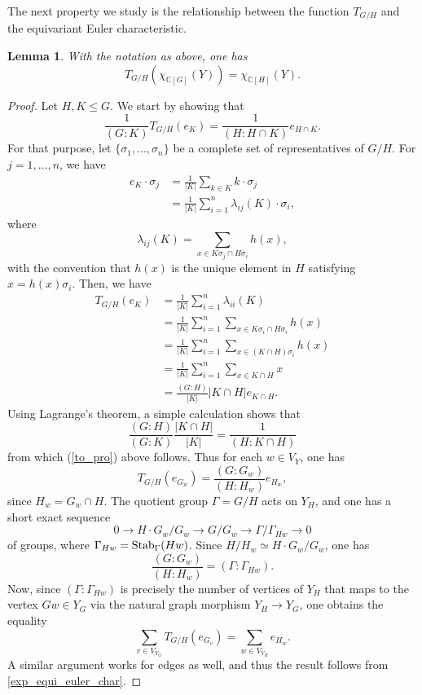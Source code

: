 \documentclass[11pt]{amsart}
\newtheorem{lemma}[theorem]{Lemma}
\numberwithin{equation}{section}
\theoremstyle{remark}
\theoremstyle{definition}
\begin{document}
The next property we study is the relationship between the function $T_{G/H}$ and the equivariant Euler characteristic.
\begin{lemma} \label{eul_and_T}
With the notation as above, one has
$$T_{G/H}(\chi_{\mathbb{C}[G]}(Y)) = \chi_{\mathbb{C}[H]}(Y). $$
\end{lemma}
\begin{proof}
Let $H,K \le G$.  We start by showing that
\begin{equation} \label{to_pro}
\frac{1}{(G:K)}T_{G/H}(e_{K}) = \frac{1}{(H:H \cap K)} e_{H \cap K}. 
\end{equation}
For that purpose, let $\{\sigma_{1},\ldots, \sigma_{n} \}$ be a complete set of representatives of $G/H$.  For $j=1,\ldots,n$, we have
\begin{equation*} 
\begin{aligned}
e_{K} \cdot \sigma_{j} &= \frac{1}{|K|} \sum_{k \in K} k \cdot \sigma_{j} \\
&= \frac{1}{|K|} \sum_{i=1}^{n} \lambda_{ij}(K) \cdot \sigma_{i},
\end{aligned}
\end{equation*}
where
$$\lambda_{ij}(K) = \sum_{x \in K\sigma_{j} \cap H \sigma_{i}} h(x), $$
with the convention that $h(x)$ is the unique element in $H$ satisfying $x = h(x)\sigma_{i}$.  Then, we have
\begin{equation*}
\begin{aligned}
T_{G/H}(e_{K}) &= \frac{1}{|K|} \sum_{i=1}^{n} \lambda_{ii}(K) \\
&= \frac{1}{|K|} \sum_{i=1}^{n} \sum_{x \in K\sigma_{i} \cap H\sigma_{i}} h(x) \\
&= \frac{1}{|K|} \sum_{i=1}^{n} \sum_{x \in (K\cap H )\sigma_{i}}h(x) \\
&= \frac{1}{|K|} \sum_{i=1}^{n} \sum_{x \in K \cap H} x \\
&= \frac{(G:H)}{|K|} |K \cap H| e_{K \cap H}.
\end{aligned}
\end{equation*}
Using Lagrange's theorem, a simple calculation shows that
$$\frac{(G:H)}{(G:K)}\frac{|K \cap H|}{|K|} = \frac{1}{(H:K\cap H)} $$
from which (\ref{to_pro}) above follows.  Thus for each $w \in V_{Y}$, one has
$$T_{G/H}(e_{G_{w}}) = \frac{(G:G_{w})}{(H:H_{w})} e_{H_{w}}, $$
since $H_{w} = G_{w} \cap H$.  The quotient group $\Gamma = G/H$ acts on $Y_{H}$, and one has a short exact sequence
\begin{equation}
0 \rightarrow H \cdot G_{w}/G_{w} \rightarrow G/G_{w} \rightarrow \Gamma/\Gamma_{Hw} \rightarrow 0
\end{equation}
of groups, where $\Gamma_{Hw} = {\rm Stab}_{\Gamma}(Hw)$.  Since $H/H_{w} \simeq H \cdot G_{w}/G_{w}$, one has
$$\frac{(G:G_{w})}{(H:H_{w})} = (\Gamma:\Gamma_{Hw}). $$
Now, since $(\Gamma:\Gamma_{Hw})$ is precisely the number of vertices of $Y_{H}$ that maps to the vertex $Gw \in Y_{G}$ via the natural graph morphism $Y_{H} \rightarrow Y_{G}$, one obtains the equality
$$\sum_{v \in V_{Y_G}}T_{G/H}(e_{G_{v}}) = \sum_{w \in V_{Y_{H}}}e_{H_{w}}. $$
A similar argument works for edges as well, and thus the result follows from \cref{exp_equi_euler_char}. 
\end{proof}
\end{document}
